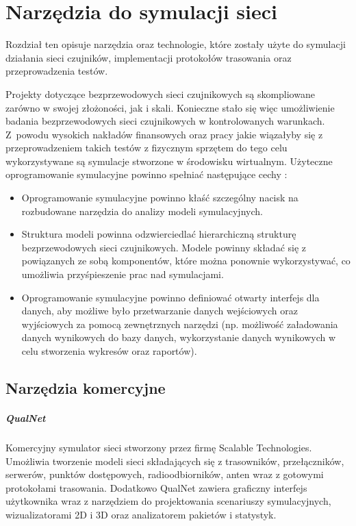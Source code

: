 \chapter{Narzędzia do symulacji sieci}
Rozdział ten opisuje narzędzia oraz technologie, które zostały użyte do symulacji działania sieci czujników, implementacji protokołów trasowania oraz przeprowadzenia testów.

Projekty dotyczące  bezprzewodowych sieci czujnikowych są skompliowane zarówno w swojej złożoności, jak i skali. Konieczne stało się więc umożliwienie badania bezprzewodowych sieci czujnikowych w kontrolowanych warunkach. Z~powodu wysokich nakładów finansowych oraz pracy jakie wiązałyby się z przeprowadzeniem takich testów z fizycznym sprzętem do tego celu wykorzystywane są symulacje stworzone w środowisku wirtualnym. Użyteczne oprogramowanie symulacyjne powinno spełniać  następujące cechy \cite{Xian2008}:
\begin{itemize}
	\item Oprogramowanie symulacyjne powinno kłaść szczególny nacisk na rozbudowane narzędzia do analizy modeli symulacyjnych.
	
	\item Struktura modeli powinna odzwierciedlać hierarchiczną strukturę bezprzewodowych sieci czujnikowych. Modele powinny składać się z powiązanych ze sobą komponentów, które można ponownie wykorzystywać, co umożliwia przyśpieszenie prac nad symulacjami.
	
	\item Oprogramowanie symulacyjne powinno definiować otwarty interfejs dla danych, aby możliwe było przetwarzanie danych wejściowych oraz wyjściowych za pomocą zewnętrznych narzędzi (np. możliwość załadowania danych wynikowych do bazy danych, wykorzystanie danych wynikowych w celu stworzenia wykresów oraz raportów).
\end{itemize}
\section{Narzędzia komercyjne}
\paragraph{QualNet \cite{Kellner10simulationenvironments}}
Komercyjny symulator sieci stworzony przez firmę Scalable Technologies. Umożliwia tworzenie modeli sieci składających się z trasowników, przełączników, serwerów, punktów dostępowych, radioodbiorników, anten wraz z gotowymi protokołami trasowania. Dodatkowo QualNet zawiera graficzny interfejs użytkownika wraz z narzędziem do projektowania scenariuszy symulacyjnych, wizualizatorami 2D i 3D oraz analizatorem pakietów i statystyk.

